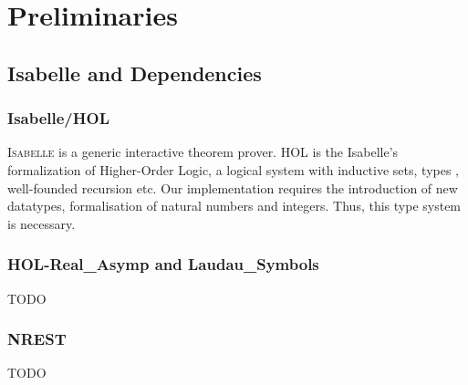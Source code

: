 \newcommand{\red}{\leq_p}
\newcommand{\problem}[3]{
\begin{definition}
    {#1} \\
    \textbf{Input}: {#2}\\
    \textbf{Output}: {#3}
\end{definition}
}

\chapter{Preliminaries}\label{chapter:preliminaries}
\section{Isabelle and Dependencies}
\subsection*{Isabelle/HOL}
\textsc{Isabelle} is a generic interactive theorem prover. \textsc{HOL} is the Isabelle's formalization of Higher-Order Logic, a logical system with inductive sets, types , well-founded recursion etc. Our implementation requires the introduction of new datatypes, formalisation of natural numbers and integers. Thus, this type system is necessary.


\subsection*{HOL-Real\_Asymp and Laudau\_Symbols}
TODO

\subsection*{NREST}
TODO

